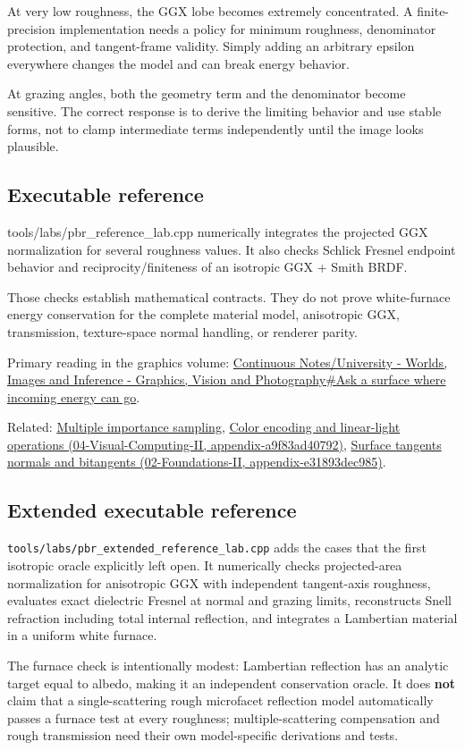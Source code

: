 At very low roughness, the GGX lobe becomes extremely concentrated. A finite-precision implementation needs a policy for minimum roughness, denominator protection, and tangent-frame validity. Simply adding an arbitrary epsilon everywhere changes the model and can break energy behavior.

At grazing angles, both the geometry term and the denominator become sensitive. The correct response is to derive the limiting behavior and use stable forms, not to clamp intermediate terms independently until the image looks plausible.

\subsection{Executable reference}\label{appendix-885c1cb64ae9-executable-reference}

tools/labs/pbr\_reference\_lab.cpp numerically integrates the projected GGX normalization for several roughness values. It also checks Schlick Fresnel endpoint behavior and reciprocity/finiteness of an isotropic GGX + Smith BRDF.

Those checks establish mathematical contracts. They do not prove white-furnace energy conservation for the complete material model, anisotropic GGX, transmission, texture-space normal handling, or renderer parity.

Primary reading in the graphics volume: \hyperref[03-visual-computing-i-ch005-ask-a-surface-where-incoming-energy-can-go]{Continuous Notes/University - Worlds, Images and Inference - Graphics, Vision and Photography\#Ask a surface where incoming energy can go}.

Related: \hyperref[appendix-ca8898faf1a6]{Multiple importance sampling}, \href{../04-Visual-Computing-II/main.pdf\#nameddest=appendix-a9f83ad40792}{Color encoding and linear-light operations (04-Visual-Computing-II, appendix-a9f83ad40792)}, \href{../02-Foundations-II/main.pdf\#nameddest=appendix-e31893dec985}{Surface tangents normals and bitangents (02-Foundations-II, appendix-e31893dec985)}.

\subsection{Extended executable reference}\label{appendix-885c1cb64ae9-extended-executable-reference}

\texttt{tools/labs/pbr\_extended\_reference\_lab.cpp} adds the cases that the first isotropic oracle explicitly left open. It numerically checks projected-area normalization for anisotropic GGX with independent tangent-axis roughness, evaluates exact dielectric Fresnel at normal and grazing limits, reconstructs Snell refraction including total internal reflection, and integrates a Lambertian material in a uniform white furnace.

The furnace check is intentionally modest: Lambertian reflection has an analytic target equal to albedo, making it an independent conservation oracle. It does \textbf{not} claim that a single-scattering rough microfacet reflection model automatically passes a furnace test at every roughness; multiple-scattering compensation and rough transmission need their own model-specific derivations and tests.
